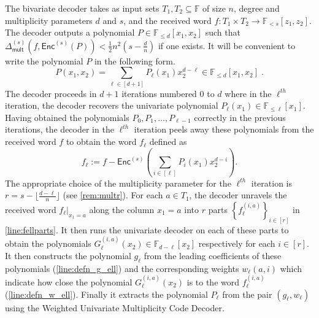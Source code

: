 \documentclass{article}
\def\Field{\mathbb{F}}
\let\F\Field
\newcommand{\enc}{{\mathsf{Enc}}}
\newcommand{\Delm}{\Delta_{\mathsf{mult}}}
\begin{document}
	The bivariate decoder takes as input sets $T_1, T_2 \subseteq \F$ of size
	$n$, degree and multiplicity parameters $d$ and $s$, and the received
	word $f \colon T_1 \times T_2 \to \mathbb{F}_{<s}[z_1, z_2]$. The
	decoder outputs a polynomial $P \in \F_{\leq d}[x_1,x_2]$ such that
	$\Delm^{(s)}(f,\enc^{(s)}(P)) < \frac{1}{2} n^2 (s-\frac{d}{n})$ if one
	exists. It will be convenient to write the polynomial $P$ in the
	following form.
	\[P(x_1,x_2) = \sum_{\ell \in [d+1]} P_{\ell}(x_1)x_2^{d-\ell} \in \mathbb{F}_{\leq d}[x_1, x_2]\;.\]
	The decoder proceeds in $d+1$ iterations numbered $0$ to $d$ where in
	the $\ell^{th}$ iteration, the decoder recovers the univariate
	polynomial $P_\ell(x_1) \in \F_{\leq \ell}[x_1]$. Having obtained the
	polynomials $P_0,P_1,\ldots, P_{\ell-1}$ correctly in the previous
	iterations, the decoder in the $\ell^{th}$ iteration peels away these
	polynomials from the received word $f$ to obtain the word $f_\ell$
	defined as \[f_\ell :=   f - \enc^{(s)}\left(\sum_{i \in [\ell]} P_i(x_1)
	x_2^{d-i}\right). \] The appropriate choice of the multiplicity parameter
	for the $\ell^{th}$ iteration is $r = s - \lfloor \frac{d-\ell}{n}
	\rfloor$ (see \cref{rem:multr}). For each $a \in T_1$, the decoder
	unravels the received word $f_\ell|_{x_1 = a}$ along the column $x_1 = a$ into
	$r$ parts $\left\{f_{\ell}^{(i, a)} \right\}_{i \in [r]}$ in
	\cref{line:fellparts}. It then runs the univariate decoder on each
	of these parts to obtain the polynomials $G^{(i,a)}_\ell(x_2)
	\in \F_{d-\ell}[x_2]$ respectively for each $i \in [r]$. It
	then constructs the polynomial $g_\ell$ from the leading
	coefficients of these polynomials (\cref{line:defn_g_ell}) and the
	corresponding weights $w_\ell(a,i)$ which indicate how
	close the polynomial $G^{(i,a)}_\ell(x_2)$ is to the word
	$f_\ell^{(i,a)}$ (\cref{line:defn_w_ell}). Finally it
	extracts the polynomial $P_\ell$ from the pair $(g_\ell,
	w_\ell)$ using the Weighted Univariate Multiplicity Code Decoder.\\
	
\end{document}
